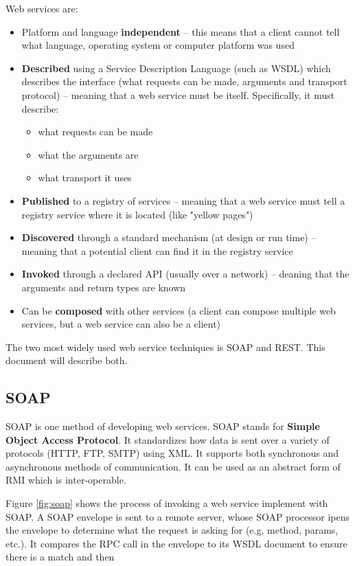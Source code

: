 \documentclass{article}
\begin{document}
Web services are:
\begin{itemize}
    \item Platform and language \textbf{independent} -- this means that a client cannot tell what language, operating system  or computer platform was used
    \item \textbf{Described} using a Service Description Language (such as WSDL) which describes the interface (what requests can be made, arguments and transport protocol) -- meaning that a web service must be itself. Specifically, it must describe:
    \begin{itemize}
    	\item what requests can be made
    	\item what the arguments are
    	\item what transport it uses
    \end{itemize}
    \item \textbf{Published} to a registry of services -- meaning that a web service must tell a registry service where it is located (like "yellow pages")
    \item \textbf{Discovered} through a standard mechanism (at design or run time) -- meaning that a potential client can find it in the registry service
    \item \textbf{Invoked} through a declared API (usually over a network) -- deaning that the arguments and return types are known
    \item Can be \textbf{composed} with other services (a client can compose multiple web services, but a web service can also be a client)
\end{itemize}

The two most widely used web service techniques is SOAP and REST. This document will describe both.

\subsection{SOAP}

SOAP is one method of developing web services. SOAP stands for \textbf{Simple Object Access Protocol}. It standardizes how data is sent over a variety of protocols (HTTP, FTP, SMTP) using XML. It supports both synchronous and asynchronous methods of communication. It can be used as an abstract form of RMI which is inter-operable. 

Figure \ref{fig:soap} shows the process of invoking a web service implement with SOAP. A SOAP envelope is sent to a remote server, whose SOAP processor ipens the envelope to determine what the request is asking for (e.g. method, params, etc.). It compares the RPC call in the envelope to its WSDL document to ensure there is a match and then 
\end{document}
